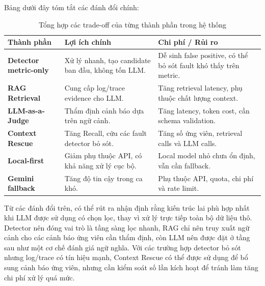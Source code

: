 Bảng dưới đây tóm tắt các đánh đổi chính:
\begin{table}[H]
    \centering
    \renewcommand{\arraystretch}{1.5} %
    \begin{tabularx}{\textwidth}{
        >{\raggedright\arraybackslash}p{3.5cm} %
        >{\raggedright\arraybackslash}X        %
        >{\raggedright\arraybackslash}X        %
    }
        \toprule
        \rowcolor{blue!5}
        \textbf{Thành phần} & \textbf{Lợi ích chính} & \textbf{Chi phí / Rủi ro} \\
        \midrule
        
        \textbf{Detector metric-only} & 
        Xử lý nhanh, tạo candidate ban đầu, không tốn LLM. & 
        Dễ sinh false positive, có thể bỏ sót fault khó thấy trên metric. \\
        \midrule
        
        \textbf{RAG Retrieval} & 
        Cung cấp log/trace evidence cho LLM. & 
        Tăng retrieval latency, phụ thuộc chất lượng context. \\
        \midrule
        
        \textbf{LLM-as-a-Judge} & 
        Thẩm định cảnh báo dựa trên ngữ cảnh. & 
        Tăng latency, token cost, cần schema validation. \\
        \midrule
        
        \textbf{Context Rescue} & 
        Tăng Recall, cứu các fault detector bỏ sót. & 
        Tăng số ứng viên, retrieval calls và LLM calls. \\
        \midrule
        
        \textbf{Local-first} & 
        Giảm phụ thuộc API, có khả năng xử lý cục bộ. & 
        Local model nhỏ chưa ổn định, vẫn cần fallback. \\
        \midrule
        
        \textbf{Gemini fallback} & 
        Tăng độ tin cậy trong ca khó. & 
        Phụ thuộc API, quota, chi phí và rate limit. \\
        
        \bottomrule
    \end{tabularx}
    \caption{Tổng hợp các trade-off của từng thành phần trong hệ thống}
    \label{tab:system_tradeoffs}
\end{table}

Từ các đánh đổi trên, có thể rút ra nhận định rằng kiến trúc lai phù hợp nhất khi LLM được sử dụng có chọn lọc, thay vì xử lý trực tiếp toàn bộ dữ liệu thô. Detector nên đóng vai trò là tầng sàng lọc nhanh, RAG chỉ nên truy xuất ngữ cảnh cho các cảnh báo ứng viên cần thẩm định, còn LLM nên được đặt ở tầng sau như một cơ chế đánh giá ngữ nghĩa. Với các trường hợp detector bỏ sót nhưng log/trace có tín hiệu mạnh, Context Rescue có thể được sử dụng để bổ sung cảnh báo ứng viên, nhưng cần kiểm soát số lần kích hoạt để tránh làm tăng chi phí xử lý quá mức.

